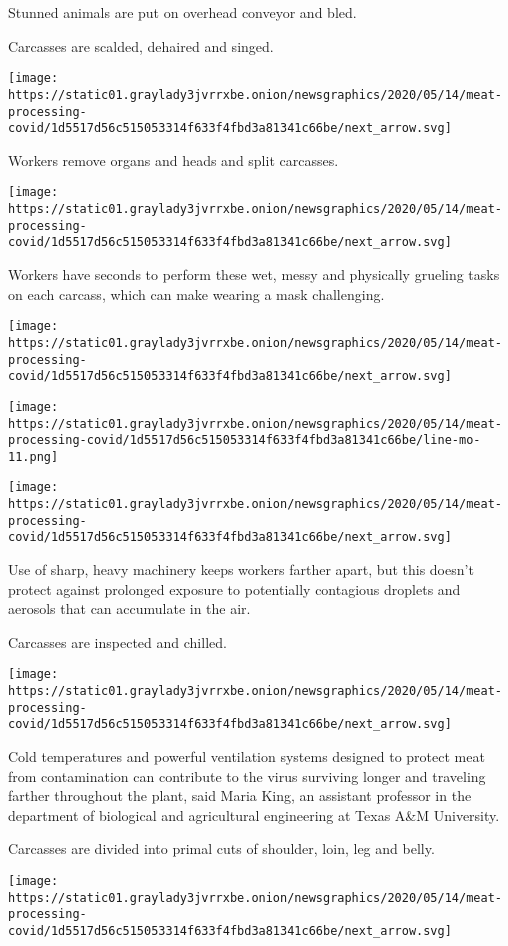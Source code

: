 Stunned animals are put on overhead conveyor and bled.

Carcasses are scalded, dehaired and singed.

\texttt{[image: https://static01.graylady3jvrrxbe.onion/newsgraphics/2020/05/14/meat-processing-covid/1d5517d56c515053314f633f4fbd3a81341c66be/next\_arrow.svg]}

Workers remove organs and heads and split carcasses.

\texttt{[image: https://static01.graylady3jvrrxbe.onion/newsgraphics/2020/05/14/meat-processing-covid/1d5517d56c515053314f633f4fbd3a81341c66be/next\_arrow.svg]}

Workers have seconds to perform these wet, messy and physically grueling
tasks on each carcass, which can make wearing a mask challenging.

\texttt{[image: https://static01.graylady3jvrrxbe.onion/newsgraphics/2020/05/14/meat-processing-covid/1d5517d56c515053314f633f4fbd3a81341c66be/next\_arrow.svg]}

\texttt{[image: https://static01.graylady3jvrrxbe.onion/newsgraphics/2020/05/14/meat-processing-covid/1d5517d56c515053314f633f4fbd3a81341c66be/line-mo-11.png]}

\texttt{[image: https://static01.graylady3jvrrxbe.onion/newsgraphics/2020/05/14/meat-processing-covid/1d5517d56c515053314f633f4fbd3a81341c66be/next\_arrow.svg]}

Use of sharp, heavy machinery keeps workers farther apart, but this
doesn't protect against prolonged exposure to potentially contagious
droplets and aerosols that can accumulate in the air.

Carcasses are inspected and chilled.

\texttt{[image: https://static01.graylady3jvrrxbe.onion/newsgraphics/2020/05/14/meat-processing-covid/1d5517d56c515053314f633f4fbd3a81341c66be/next\_arrow.svg]}

Cold temperatures and powerful ventilation systems designed to protect
meat from contamination can contribute to the virus surviving longer and
traveling farther throughout the plant, said Maria King, an assistant
professor in the department of biological and agricultural engineering
at Texas A\&M University.

Carcasses are divided into primal cuts of shoulder, loin, leg and belly.

\texttt{[image: https://static01.graylady3jvrrxbe.onion/newsgraphics/2020/05/14/meat-processing-covid/1d5517d56c515053314f633f4fbd3a81341c66be/next\_arrow.svg]}

